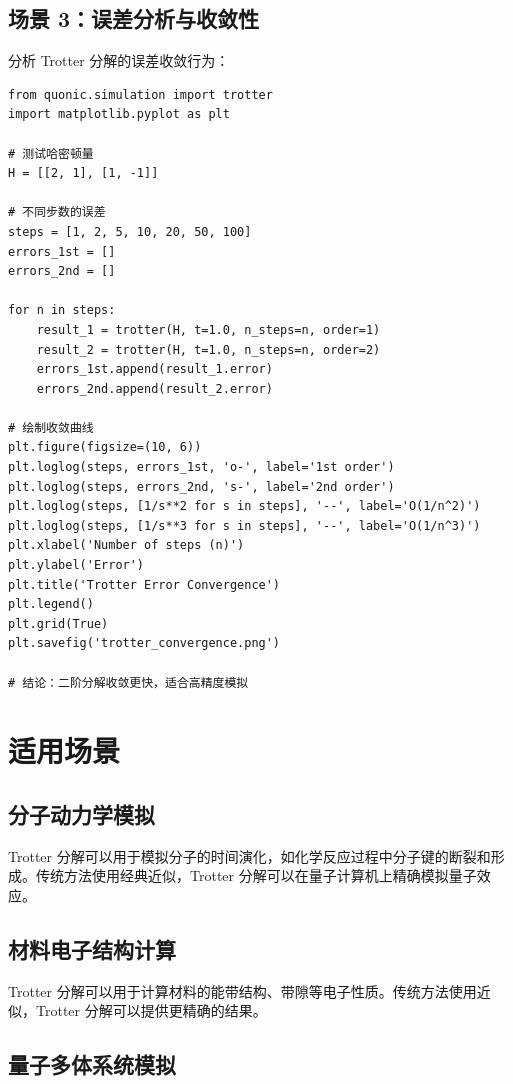 \documentclass[12pt,a4paper]{article}
\begin{document}
\subsection{场景 3：误差分析与收敛性}

分析 Trotter 分解的误差收敛行为：

\begin{verbatim}
from quonic.simulation import trotter
import matplotlib.pyplot as plt

# 测试哈密顿量
H = [[2, 1], [1, -1]]

# 不同步数的误差
steps = [1, 2, 5, 10, 20, 50, 100]
errors_1st = []
errors_2nd = []

for n in steps:
    result_1 = trotter(H, t=1.0, n_steps=n, order=1)
    result_2 = trotter(H, t=1.0, n_steps=n, order=2)
    errors_1st.append(result_1.error)
    errors_2nd.append(result_2.error)

# 绘制收敛曲线
plt.figure(figsize=(10, 6))
plt.loglog(steps, errors_1st, 'o-', label='1st order')
plt.loglog(steps, errors_2nd, 's-', label='2nd order')
plt.loglog(steps, [1/s**2 for s in steps], '--', label='O(1/n^2)')
plt.loglog(steps, [1/s**3 for s in steps], '--', label='O(1/n^3)')
plt.xlabel('Number of steps (n)')
plt.ylabel('Error')
plt.title('Trotter Error Convergence')
plt.legend()
plt.grid(True)
plt.savefig('trotter_convergence.png')

# 结论：二阶分解收敛更快，适合高精度模拟
\end{verbatim}

\section{适用场景}

\subsection{分子动力学模拟}

Trotter 分解可以用于模拟分子的时间演化，如化学反应过程中分子键的断裂和形成。传统方法使用经典近似，Trotter 分解可以在量子计算机上精确模拟量子效应。

\subsection{材料电子结构计算}

Trotter 分解可以用于计算材料的能带结构、带隙等电子性质。传统方法使用近似，Trotter 分解可以提供更精确的结果。

\subsection{量子多体系统模拟}
\end{document}
